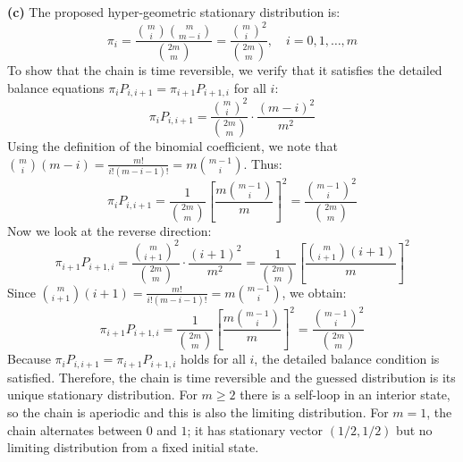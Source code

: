{\textbf{(c)} The proposed hyper-geometric stationary distribution is:
\[
\pi_i = \frac{\binom{m}{i}\binom{m}{m-i}}{\binom{2m}{m}} = \frac{\binom{m}{i}^2}{\binom{2m}{m}}, \quad i = 0, 1, \dots, m
\]
To show that the chain is time reversible, we verify that it satisfies the detailed balance equations $\pi_i P_{i, i+1} = \pi_{i+1} P_{i+1, i}$ for all $i$:
\[
\pi_i P_{i, i+1} = \frac{\binom{m}{i}^2}{\binom{2m}{m}} \cdot \frac{(m - i)^2}{m^2}
\]
Using the definition of the binomial coefficient, we note that $\binom{m}{i}(m-i) = \frac{m!}{i!(m-i-1)!} = m \binom{m-1}{i}$. Thus:
\[
\pi_i P_{i, i+1} = \frac{1}{\binom{2m}{m}} \left[ \frac{m \binom{m-1}{i}}{m} \right]^2 = \frac{\binom{m-1}{i}^2}{\binom{2m}{m}}
\]
Now we look at the reverse direction:
\[
\pi_{i+1} P_{i+1, i} = \frac{\binom{m}{i+1}^2}{\binom{2m}{m}} \cdot \frac{(i + 1)^2}{m^2} = \frac{1}{\binom{2m}{m}} \left[ \frac{\binom{m}{i+1}(i+1)}{m} \right]^2
\]
Since $\binom{m}{i+1}(i+1) = \frac{m!}{i!(m-i-1)!} = m \binom{m-1}{i}$, we obtain:
\[
\pi_{i+1} P_{i+1, i} = \frac{1}{\binom{2m}{m}} \left[ \frac{m \binom{m-1}{i}}{m} \right]^2 = \frac{\binom{m-1}{i}^2}{\binom{2m}{m}}
\]
Because $\pi_i P_{i, i+1} = \pi_{i+1} P_{i+1, i}$ holds for all $i$, the detailed balance condition is satisfied. Therefore, the chain is time reversible and the guessed distribution is its unique stationary distribution. For $m\ge2$ there is a self-loop in an interior state, so the chain is aperiodic and this is also the limiting distribution. For $m=1$, the chain alternates between $0$ and $1$; it has stationary vector $(1/2,1/2)$ but no limiting distribution from a fixed initial state.
}

